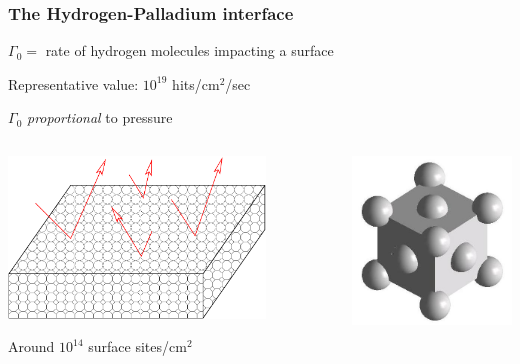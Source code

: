 \documentclass[10pt]{beamer}
\begin{document}
\begin{frame}
  \frametitle{The Hydrogen-Palladium interface}

$\Gamma_0 = $ rate of hydrogen molecules impacting a surface

Representative value: $10^{19}$ hits/cm$^2$/sec

$\Gamma_0$ \emph{proportional} to pressure

\bigskip

\begin{columns}
  \begin{column}{.6\textwidth}
    \includegraphics[width=0.8\textwidth]{bounce.pdf}
    \smallskip

    Around $10^{14}$ surface sites/cm$^2$
  \end{column}
\pause
  \begin{column}{.3\textwidth}
    \includegraphics[width=\textwidth]{fcc.jpg}
  \end{column}
\end{columns}

\end{frame}
\end{document}
